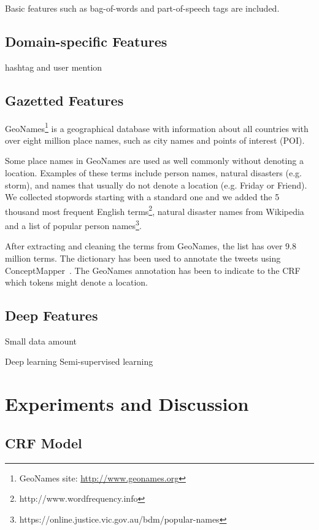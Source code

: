 \documentclass[11pt]{article}
\begin{document}
Basic features such as bag-of-words and part-of-speech tags are included.

\subsection{Domain-specific Features}
hashtag and user mention

\subsection{Gazetted Features}

GeoNames\footnote{GeoNames site: \url{http://www.geonames.org}} is a geographical database with information about all countries with over eight million place names, such as city names and points of interest (POI).

Some place names in GeoNames are used as well commonly without denoting a location.
Examples of these terms include person names, natural disasters (e.g. storm), and names that usually do not denote a location (e.g. Friday or Friend).
We collected stopwords starting with a standard one and we added the 5 thousand most frequent English terms\footnote{http://www.wordfrequency.info}, natural disaster names from Wikipedia and a list of popular person names\footnote{https://online.justice.vic.gov.au/bdm/popular-names}.

After extracting and cleaning the terms from GeoNames, the list has over 9.8 million terms.
The dictionary has been used to annotate the tweets using ConceptMapper~\cite{tanenblatt2010conceptmapper}.
The GeoNames annotation has been to indicate to the CRF which tokens might denote a location.

\subsection{Deep Features}

Small data amount

Deep learning
Semi-supervised learning



\section{Experiments and Discussion}
\label{sec:experiment}

\subsection{CRF Model}
\end{document}
